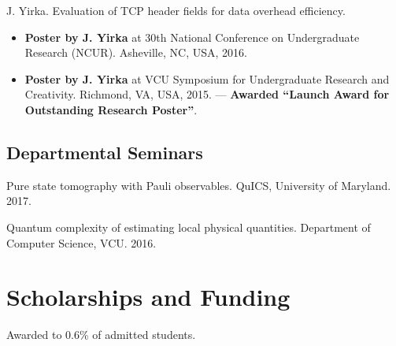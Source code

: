 \documentclass[11pt,letterpaper,serif]{moderncv}
\newcommand{\pubItemSep}{0.3em}
\begin{document}
J. Yirka. Evaluation of TCP header fields for data overhead efficiency.
\begin{adjustwidth}{.25in}{}
	\begin{itemize}[itemsep=\pubItemSep]
		\item \textbf{Poster by J. Yirka} at 30th National Conference on Undergraduate Research (NCUR). Asheville, NC, USA, 2016.
		\item \textbf{Poster by J. Yirka} at VCU Symposium for Undergraduate Research and Creativity. Richmond, VA, USA, 2015. --- \textbf{Awarded ``Launch Award for Outstanding Research Poster''}.	
	\end{itemize}
\end{adjustwidth}


\subsection{Departmental Seminars}
{ \leftskip 0.2in \parindent -0.2in %
	
Pure state tomography with Pauli observables. QuICS, University of Maryland. 2017.

Quantum complexity of estimating local physical quantities. Department of Computer Science, VCU. 2016.

}


\section{Scholarships and Funding \hspace{2em}{\footnotesize (all dollar amounts in USD)}}
{	
	\begin{adjustwidth}{.25in}{}
		Awarded to 0.6\% of admitted students. 
	\end{adjustwidth}
}

\vspace{4\parskip}

\end{document}
